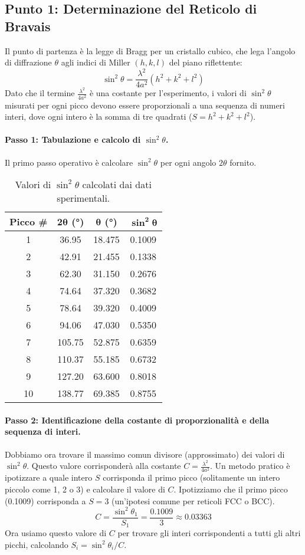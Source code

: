 \subsection{Punto 1: Determinazione del Reticolo di Bravais}

Il punto di partenza è la legge di Bragg per un cristallo cubico, che lega l'angolo di diffrazione $\theta$ agli indici di Miller $(h,k,l)$ del piano riflettente:
$$ \sin^2\theta = \frac{\lambda^2}{4a^2}(h^2+k^2+l^2) $$
Dato che il termine $\frac{\lambda^2}{4a^2}$ è una costante per l'esperimento, i valori di $\sin^2\theta$ misurati per ogni picco devono essere proporzionali a una sequenza di numeri interi, dove ogni intero è la somma di tre quadrati ($S = h^2+k^2+l^2$).

\paragraph{Passo 1: Tabulazione e calcolo di $\sin^2\theta$.}
Il primo passo operativo è calcolare $\sin^2\theta$ per ogni angolo $2\theta$ fornito.

\begin{table}[h!]
\centering
\begin{tabular}{|c|c|c|c|}
\hline
\textbf{Picco \#} & $\mathbf{2\theta}$ \textbf{(°)} & $\mathbf{\theta}$ \textbf{(°)} & $\mathbf{\sin^2\theta}$ \\
\hline
1 & 36.95 & 18.475 & 0.1009 \\
2 & 42.91 & 21.455 & 0.1338 \\
3 & 62.30 & 31.150 & 0.2676 \\
4 & 74.64 & 37.320 & 0.3682 \\
5 & 78.64 & 39.320 & 0.4009 \\
6 & 94.06 & 47.030 & 0.5350 \\
7 & 105.75 & 52.875 & 0.6359 \\
8 & 110.37 & 55.185 & 0.6732 \\
9 & 127.20 & 63.600 & 0.8018 \\
10 & 138.77 & 69.385 & 0.8755 \\
\hline
\end{tabular}
\caption{Valori di $\sin^2\theta$ calcolati dai dati sperimentali.}
\end{table}

\paragraph{Passo 2: Identificazione della costante di proporzionalità e della sequenza di interi.}
Dobbiamo ora trovare il massimo comun divisore (approssimato) dei valori di $\sin^2\theta$. Questo valore corrisponderà alla costante $C = \frac{\lambda^2}{4a^2}$. Un metodo pratico è ipotizzare a quale intero $S$ corrisponda il primo picco (solitamente un intero piccolo come 1, 2 o 3) e calcolare il valore di $C$.
Ipotizziamo che il primo picco (0.1009) corrisponda a $S=3$ (un'ipotesi comune per reticoli FCC o BCC).
$$ C = \frac{\sin^2\theta_1}{S_1} = \frac{0.1009}{3} \approx 0.03363 $$
Ora usiamo questo valore di $C$ per trovare gli interi corrispondenti a tutti gli altri picchi, calcolando $S_i = \sin^2\theta_i / C$.

